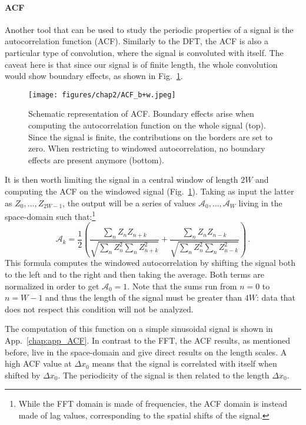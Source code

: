 \paragraph{ACF}
Another tool that can be used to study the periodic properties of a signal is the autocorrelation function (ACF). Similarly to the DFT, the ACF is also a particular type of convolution, where the signal is convoluted with itself. The caveat here is that since our signal is of finite length, the whole convolution would show boundary effects, as shown in Fig.\ \ref{fig:ACF_b+w}.
\begin{figure}[ht!]
    \centering
    \texttt{[image: figures/chap2/ACF\_b+w.jpeg]}
    \caption{Schematic representation of ACF. Boundary effects arise when computing the autocorrelation function on the whole signal (top). Since the signal is finite, the contributions on the borders are set to zero. When restricting to windowed autocorrelation, no boundary effects are present anymore (bottom).}
    \label{fig:ACF_b+w}
\end{figure}
It is then worth limiting the signal in a central window of length $2W$ and computing the ACF on the windowed signal (Fig.\ \ref{fig:ACF_b+w}). Taking as input the latter as $Z_0,\dots,Z_{2W-1}$, the output will be a series of values $\mathcal{A}_0,\dots,\mathcal{A}_{W}$ living in the space-domain such that:\footnote{While the FFT domain is made of frequencies, the ACF domain is instead made of lag values, corresponding to the spatial shifts of the signal.}
\begin{equation*}
    \mathcal{A}_k = \frac{1}{2} \left( \frac{\sum_{n} Z_n Z_{n+k}}{\sqrt{\sum_{n} Z_n^2 \sum_{n} Z_{n+k}^2}} + \frac{\sum_{n} Z_n Z_{n-k}}{\sqrt{\sum_{n} Z_n^2 \sum_{n} Z_{n-k}^2}} \right)\, .
\end{equation*}
This formula computes the windowed autocorrelation by shifting the signal both to the left and to the right and then taking the average.
Both terms are normalized in order to get $\mathcal{A}_0 = 1$. 
Note that the sums run from $n = 0$ to $n = W-1$ and thus the length of the signal must be greater than $4W$: data that does not respect this condition will not be analyzed.

The computation of this function on a simple sinusoidal signal is shown in App.\ \ref{chap:app_ACF}. In contrast to the FFT, the ACF results, as mentioned before, live in the space-domain and give direct results on the length scales. A high ACF value at $\Delta x_0$ means that the signal is correlated with itself when shifted by $\Delta x_0$. The periodicity of the signal is then related to the length $\Delta x_0$.

